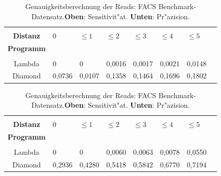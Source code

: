 \documentclass[10pt, a4paper]{report}[08.12.2015]
\begin{document}
         \begin{table}[H]
        \begin{tabular}{clllllll}
          &&&&&&\\
          \textbf{Distanz}&0&$\leq1$&$\leq2$&$\leq3$&$\leq4$&$\leq5$\\
          \textbf{Programm}&&&&&\\ \hline  
          &&&&&&\\
          Lambda&0&0&0,0016&0,0017&0,0021&0,0148\\
          Diamond&0,0736&0,0107&0,1358&0,1464&0,1696&0,1802\\
        \end{tabular}

        \begin{tabular}{clllllll}
        &&&&&&\\
          \textbf{Distanz}&0&$\leq1$&$\leq2$&$\leq3$&$\leq4$&$\leq5$\\
          \textbf{Programm}&&&&&\\ \hline  
          &&&&&&\\
          Lambda&0&0&0,0060&0,0063&0,0078&0,0550\\
          Diamond&0,2936&0,4280&0,5418&0,5842&0,6770&0,7194\\
        \end{tabular}
        \newline
        \caption[Genauigkeitsberechnung der Reads: FACS Benchmark-Datensatz.]{\small{Genauigkeitsberechnung der Reads: FACS Benchmark-Datensatz.\newline \textbf{Oben}: Sensitivit"at. \textbf{Unten}: Pr"azision.} }
        \label{tab:Facs}
         \end{table}
\end{document}
